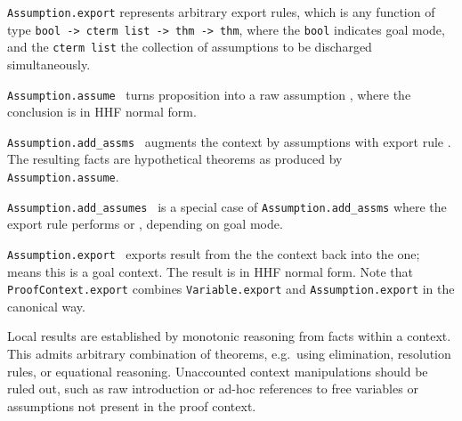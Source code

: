 \begin{isabellebody}
\begin{isamarkuptext}
  \begin{description}

  \item \verb|Assumption.export| represents arbitrary export
  rules, which is any function of type \verb|bool -> cterm list -> thm -> thm|,
  where the \verb|bool| indicates goal mode, and the \verb|cterm list| the collection of assumptions to be discharged
  simultaneously.

  \item \verb|Assumption.assume|~ turns proposition  into a raw assumption , where the conclusion
   is in HHF normal form.

  \item \verb|Assumption.add_assms|~ augments the context
  by assumptions  with export rule .  The
  resulting facts are hypothetical theorems as produced by \verb|Assumption.assume|.

  \item \verb|Assumption.add_assumes|~ is a special case of
  \verb|Assumption.add_assms| where the export rule performs  or , depending on goal mode.

  \item \verb|Assumption.export|~
  exports result  from the the  context
  back into the  one;  means
  this is a goal context.  The result is in HHF normal form.  Note
  that \verb|ProofContext.export| combines \verb|Variable.export|
  and \verb|Assumption.export| in the canonical way.

  \end{description}%
\end{isamarkuptext}%
\isamarkuptrue%
%
\endisatagmlref
{\isafoldmlref}%
%
\isadelimmlref
%
\endisadelimmlref
%
\isamarkuptrue%
%
\begin{isamarkuptext}%
Local results are established by monotonic reasoning from facts
  within a context.  This admits arbitrary combination of theorems,
  e.g.\ using \isa{{\isasymAnd}{\isacharslash}{\isasymLongrightarrow}} elimination, resolution rules, or
  equational reasoning.  Unaccounted context manipulations should be
  ruled out, such as raw \isa{{\isasymAnd}{\isacharslash}{\isasymLongrightarrow}} introduction or ad-hoc
  references to free variables or assumptions not present in the proof
  context.


\end{isamarkuptext}
\end{isabellebody}
